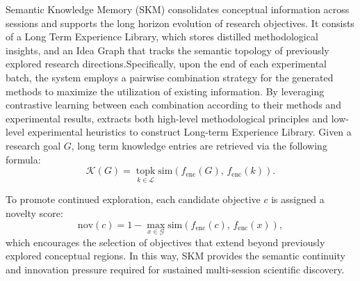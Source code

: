 Semantic Knowledge Memory (SKM) consolidates conceptual information across sessions and supports the long horizon evolution of research objectives. It consists of a Long Term Experience Library, which stores distilled methodological insights, and an Idea Graph that tracks the semantic topology of previously explored research directions.Specifically, upon the end of each experimental batch, the system employs a pairwise combination strategy for the generated methods to maximize the utilization of existing information. By leveraging contrastive learning between each combination according to their methods and experimental results, {\ProjectName} extracts both high-level methodological principles and low-level experimental heuristics to construct Long-term Experience Library.
Given a research goal $G$, long term knowledge entries are retrieved via the following formula:
\begin{equation}
\mathcal{K}(G) =
\operatorname*{topk}_{k \in \mathcal{L}}
\mathrm{sim}\!\left( f_{\text{enc}}(G),\, f_{\text{enc}}(k) \right).
\end{equation}

To promote continued exploration, each candidate objective $c$ is assigned a novelty score:
\begin{equation}
\mathrm{nov}(c) =
1 - \max_{x \in \mathcal{G}}
\mathrm{sim}\!\left( f_{\text{enc}}(c),\, f_{\text{enc}}(x) \right),
\end{equation}
which encourages the selection of objectives that extend beyond previously explored conceptual regions.  
In this way, SKM provides the semantic continuity and innovation pressure required for sustained multi-session scientific discovery.
